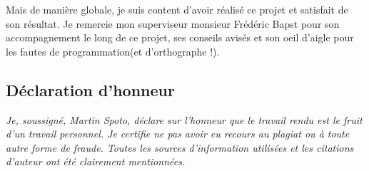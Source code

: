 \documentclass[../report.tex]{subfiles}
\begin{document}
Mais de manière globale, je suis content d'avoir réalisé ce projet et satisfait de son résultat. Je remercie mon superviseur monsieur Frédéric Bapst pour son accompagnement le long de ce projet, ses conseils avisés et son oeil d'aigle pour les fautes de programmation(et d'orthographe !).
\subsection*{Déclaration d'honneur}
\textit{Je, soussigné, Martin Spoto, déclare sur l’honneur que le travail rendu est le fruit d’un travail
personnel. Je certifie ne pas avoir eu recours au plagiat ou à toute autre forme de fraude.
Toutes les sources d’information utilisées et les citations d’auteur ont été clairement
mentionnées.}
\vspace{2cm}
\end{document}

